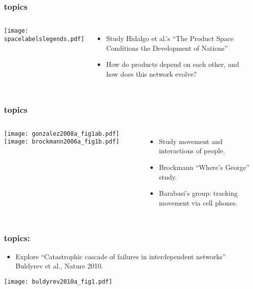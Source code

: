 \begin{frame}
  \frametitle{topics}

  \begin{columns}
      \texttt{[image: spacelabelslegends.pdf]}
      \begin{itemize}
      \item 
        Study Hidalgo et al.'s ``The Product Space Conditions the Development of Nations''\cite{hidalgo2007a}
      \item 
        How do products depend on each other, and how does this network evolve?
      \end{itemize}      
  \end{columns}

\end{frame}

\begin{frame}
  \frametitle{topics}

  \begin{columns}
    \texttt{[image: gonzalez2008a\_fig1ab.pdf]}
    \texttt{[image: brockmann2006a\_fig1b.pdf]}
    \begin{itemize}
    \item<1-> 
      Study movement and interactions of people.
    \item<1-> 
      Brockmann \etal\cite{brockmann2006a} ``Where's George'' study.
    \item<1-> 
      Barabasi's group: tracking movement
      via cell phones\cite{gonzalez2008a}.
    \end{itemize}
  \end{columns}

\end{frame}


\begin{frame}
  \frametitle{topics:}

  \begin{itemize}
  \item 
    Explore ``Catastrophic cascade of failures in interdependent networks''
    Buldyrev et al., Nature 2010\cite{buldyrev2010a}.
  \end{itemize}

  \begin{center}
    \texttt{[image: buldyrev2010a\_fig1.pdf]}
  \end{center}

\end{frame}


